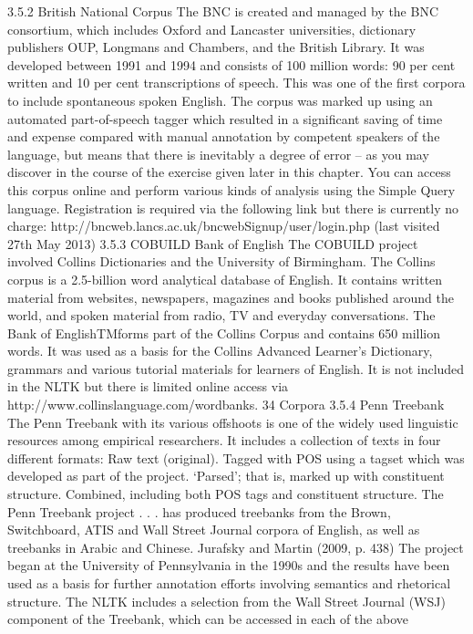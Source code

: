 3.5.2 British National Corpus
The BNC is created and managed by the BNC consortium, which includes Oxford
and Lancaster universities, dictionary publishers OUP, Longmans and Chambers, and
the British Library. It was developed between 1991 and 1994 and consists of 100
million words: 90 per cent written and 10 per cent transcriptions of speech. This
was one of the first corpora to include spontaneous spoken English. The corpus was
marked up using an automated part-of-speech tagger which resulted in a significant
saving of time and expense compared with manual annotation by competent
speakers of the language, but means that there is inevitably a degree of error – as
you may discover in the course of the exercise given later in this chapter.
You can access this corpus online and perform various kinds of analysis using the
Simple Query language. Registration is required via the following link but there is
currently no charge:
http://bncweb.lancs.ac.uk/bncwebSignup/user/login.php (last visited 27th
May 2013)
3.5.3 COBUILD Bank of English
The COBUILD project involved Collins Dictionaries and the University of
Birmingham. The Collins corpus is a 2.5-billion word analytical database of English.
It contains written material from websites, newspapers, magazines and books
published around the world, and spoken material from radio, TV and everyday
conversations. The Bank of EnglishTMforms part of the Collins Corpus and contains
650 million words. It was used as a basis for the Collins Advanced Learner’s
Dictionary, grammars and various tutorial materials for learners of English. It is not
included in the NLTK but there is limited online access via
http://www.collinslanguage.com/wordbanks.
34
Corpora
3.5.4 Penn Treebank
The Penn Treebank with its various offshoots is one of the widely used linguistic
resources among empirical researchers.
It includes a collection of texts in four different formats:
Raw text (original).
Tagged with POS using a tagset which was developed as part of the project.
‘Parsed’; that is, marked up with constituent structure.
Combined, including both POS tags and constituent structure.
The Penn Treebank project . . . has produced treebanks from the Brown, Switchboard, ATIS and Wall Street
Journal corpora of English, as well as treebanks in Arabic and Chinese.
Jurafsky and Martin (2009, p. 438)
The project began at the University of Pennsylvania in the 1990s and the results
have been used as a basis for further annotation efforts involving semantics and
rhetorical structure. The NLTK includes a selection from the Wall Street Journal
(WSJ) component of the Treebank, which can be accessed in each of the above
